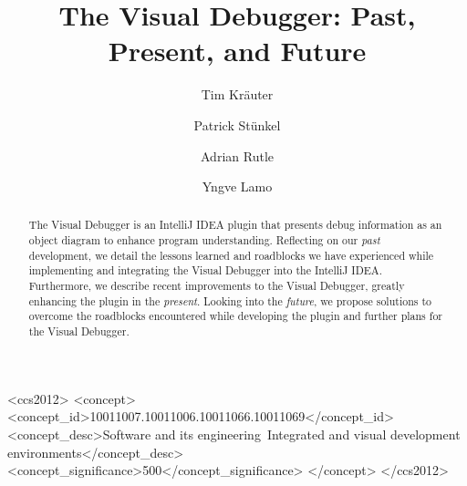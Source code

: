 \documentclass[sigconf]{acmart}
\begin{document}
\title{The Visual Debugger: Past, Present, and Future}

\author{Tim Kr\"{a}uter}

\author{Patrick Stünkel}

\author{Adrian Rutle}

\author{Yngve Lamo}

\renewcommand{\shortauthors}{Kräuter et al.}
\newcommand{\intellij}{IntelliJ IDEA}

\begin{abstract}
    The Visual Debugger is an IntelliJ IDEA plugin that presents debug information as an object diagram to enhance program understanding.
    Reflecting on our \textit{past} development, we detail the lessons learned and roadblocks we have experienced while implementing and integrating the Visual Debugger into the IntelliJ IDEA.
    Furthermore, we describe recent improvements to the Visual Debugger, greatly enhancing the plugin in the \textit{present}.
    Looking into the \textit{future}, we propose solutions to overcome the roadblocks encountered while developing the plugin and further plans for the Visual Debugger.
\end{abstract}

\begin{CCSXML}
<ccs2012>
   <concept>
       <concept_id>10011007.10011006.10011066.10011069</concept_id>
       <concept_desc>Software and its engineering~Integrated and visual development environments</concept_desc>
       <concept_significance>500</concept_significance>
       </concept>
 </ccs2012>
\end{CCSXML}


\end{document}
